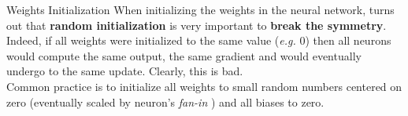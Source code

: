 \documentclass[aspectratio=169]{beamer}
\begin{document}

\begin{frame}{Weights Initialization}
When initializing the weights in the neural network, turns out that \textbf{random initialization} is very important to \textbf{break the symmetry}.\\
\vspace{0.2cm}
Indeed, if all weights were initialized to the same value (\emph{e.g.} $0$) then all neurons would compute the same output, the same gradient and would eventually undergo to the same update. Clearly, this is bad.\\
\vspace{0.2cm}
Common practice is to initialize all weights to small random numbers centered on zero (eventually scaled by neuron's \emph{fan-in} \cite{glorot2010understanding,he2015delving}) and all biases to zero.
\end{frame}
\end{document}

